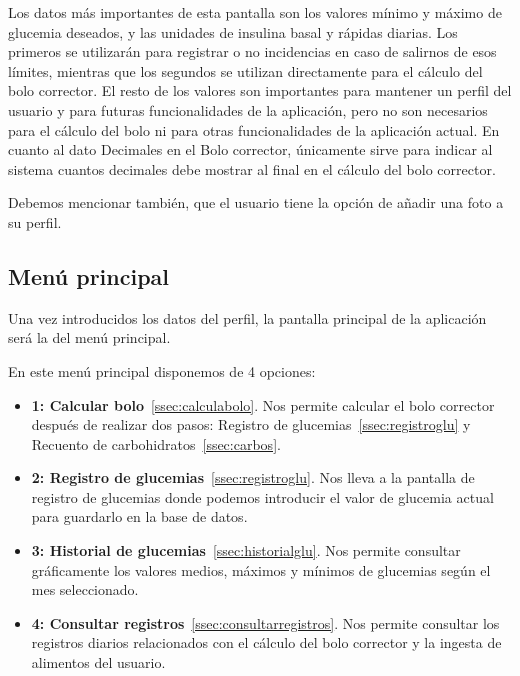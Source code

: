 Los datos más importantes de esta pantalla son los valores mínimo y máximo de glucemia deseados, y las unidades de insulina basal y rápidas diarias. Los primeros se utilizarán para registrar o no incidencias en caso de salirnos de esos límites, mientras que los segundos se utilizan directamente para el cálculo del bolo corrector. El resto de los valores son importantes para mantener un perfil del usuario y para futuras funcionalidades de la aplicación, pero no son necesarios para el cálculo del bolo ni para otras funcionalidades de la aplicación actual. 
En cuanto al dato Decimales en el Bolo corrector, únicamente sirve para indicar al sistema cuantos decimales debe mostrar al final en el cálculo del bolo corrector.

Debemos mencionar también, que el usuario tiene la opción de añadir una foto a su perfil.

\subsection{Menú principal}\label{ssec:menuprincipal}
Una vez introducidos los datos del perfil, la pantalla principal de la aplicación será la del menú principal. 

En este menú principal disponemos de 4 opciones:
\begin{itemize}
	\item \textbf{1: Calcular bolo}~\ref{ssec:calculabolo}. Nos permite calcular el bolo corrector después de realizar dos pasos: Registro de glucemias~\ref{ssec:registroglu} y Recuento de carbohidratos~\ref{ssec:carbos}.
	\item \textbf{2: Registro de glucemias}~\ref{ssec:registroglu}. Nos lleva a la pantalla de registro de glucemias donde podemos introducir el valor de glucemia actual para guardarlo en la base de datos.
	\item \textbf{3: Historial de glucemias}~\ref{ssec:historialglu}. Nos permite consultar gráficamente los valores medios, máximos y mínimos de glucemias según el mes seleccionado.
	\item \textbf{4: Consultar registros}~\ref{ssec:consultarregistros}. Nos permite consultar los registros diarios relacionados con el cálculo del bolo corrector y la ingesta de alimentos del usuario.
\end{itemize}

